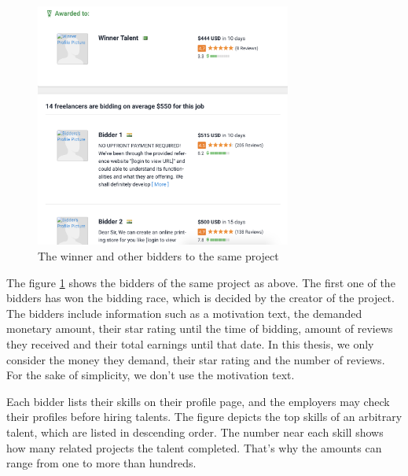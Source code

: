 \begin{figure}[htp]
	\centering
	\includegraphics[width=0.75\textwidth]{figures/FreelancerTalentExample.png}
	\caption{The winner and other bidders to the same project}
	\label{fig:freelancer-example-talent}
\end{figure}


The figure \ref{fig:freelancer-example-talent} shows the bidders of the same project as above. The first one of the bidders has won the bidding race, which is decided by the creator of the project. The bidders include information such as a motivation text, the demanded monetary amount, their star rating until the time of bidding, amount of reviews they received and their total earnings until that date. In this thesis, we only consider the money they demand, their star rating and the number of reviews. For the sake of simplicity, we don't use the motivation text.



Each bidder lists their skills on their profile page, and the employers may check their profiles before hiring talents. The figure depicts the top skills of an arbitrary talent, which are listed in descending order. The number near each skill shows how many related projects the talent completed. That's why the amounts can range from one to more than hundreds. 



